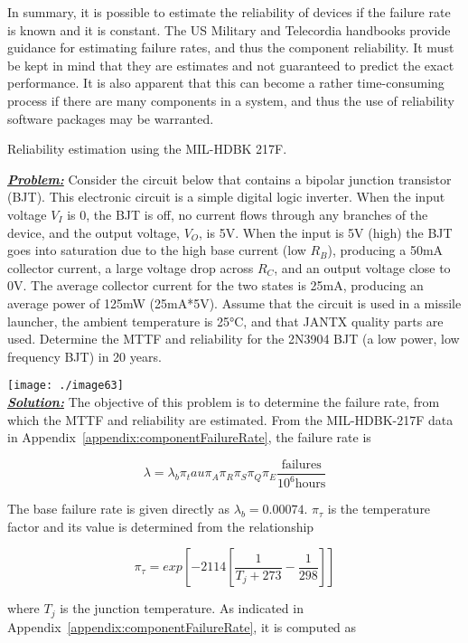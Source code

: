 {In summary, it is possible to estimate the reliability of devices if the
failure rate is known and it is constant. The US Military and Telecordia
handbooks provide guidance for estimating failure rates, and thus the
component reliability. It must be kept in mind that they are estimates
and not guaranteed to predict the exact performance. It is also apparent
that this can become a rather time-consuming process if there are many
components in a system, and thus the use of reliability software
packages may be warranted.

\begin{example}{Reliability estimation using the MIL-HDBK 217F.}
\label{example:systemReliabilityEstimationUsingMIL}

\emph{\textbf{\ul{Problem:}}} Consider the circuit below that contains a
bipolar junction transistor (BJT). This electronic circuit is a simple
digital logic inverter. When the input voltage $V_I$ is 0, 
the BJT is off, no current
flows through any branches of the device, and the output voltage,
$V_O$, is 5V. When the input is 5V
(high) the BJT goes into saturation due to the high base current (low
$R_B$), producing a 50mA collector
current, a large voltage drop across $R_C$, and an output
voltage close to 0V. The average collector current for the two states is
25mA, producing an average power of 125mW (25mA*5V). Assume that the
circuit is used in a missile launcher, the ambient temperature is 25°C,
and that JANTX quality parts are used. Determine the MTTF and
reliability for the 2N3904 BJT (a low power, low frequency BJT) in 20
years.

\texttt{[image: ./image63]}\\


\noindent\emph{\textbf{\ul{Solution:}}} The objective of this problem is to
determine the failure rate, from which the MTTF and reliability are
estimated. From the MIL-HDBK-217F data in 
Appendix~\ref{appendix:componentFailureRate}, the failure rate
is


$$\lambda=\lambda_b \pi_tau \pi_A \pi_R \pi_S \pi_Q \pi_E \frac{\text{failures}}{10^6 \text{hours}}$$


The base failure rate is given directly as
$\lambda_b = 0.00074$.   $\pi_\tau$ is the temperature factor and
its value is determined from the relationship

$$\pi_\tau = exp [-2114 [ \frac{1}{T_j + 273} - \frac{1}{298} ] ]$$

where $T_j$ is the junction temperature. As
indicated in
 Appendix~\ref{appendix:componentFailureRate}, it is computed as


\end{example}}
